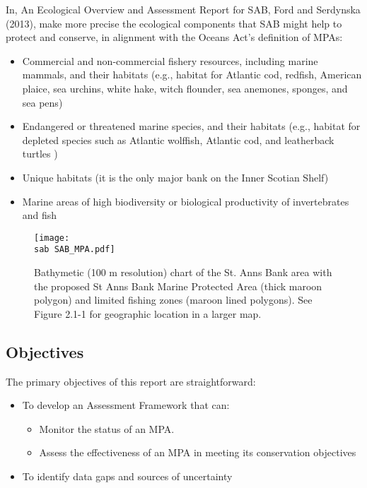 \documentclass[letterpaper,portrait,11pt]{scrartcl}
\numberwithin{equation}{section}		%
\numberwithin{figure}{section}			%
\numberwithin{table}{section}				%
\newcommand{\ecomod}{\string~/ecomod_data/}   %
\newcommand{\sab}{\ecomod/mpa/sab/}   %
\newcommand{\analysis}{\ecomod/mpa/analysis/}   %
\begin{document}
In, An Ecological Overview and Assessment Report for SAB, Ford and Serdynska (2013), make more precise the ecological components that SAB might help to protect and conserve, in alignment with the Oceans Act's definition of MPAs:

\begin{itemize}
	\item Commercial and non-commercial fishery resources, including marine mammals, and their habitats (e.g., habitat for Atlantic cod, redfish, American plaice, sea urchins, white hake, witch flounder, sea anemones, sponges, and sea pens)
  \item Endangered or threatened marine species, and their habitats (e.g., habitat for depleted species such as Atlantic wolffish, Atlantic cod, and leatherback turtles )
  \item Unique habitats (it is the only major bank on the Inner Scotian Shelf)
  \item Marine areas of high biodiversity or biological productivity of invertebrates and fish
\end{itemize}

\begin{figure}[h]
  \centering
  \texttt{[image: \\sab SAB\_MPA.pdf]}
  
  \caption{Bathymetic (100 m resolution) chart of the  St. Anns Bank area with the proposed St Anns Bank Marine Protected Area (thick maroon polygon) and limited fishing zones (maroon lined polygons). See Figure 2.1-1 for geographic location in a larger map.}
  \label{figSABCloseup}
\end{figure}

\subsection{Objectives}

The primary objectives of this report are straightforward:

\begin{itemize}
	\item To develop an Assessment Framework that can:
  \begin{itemize}
    \item	Monitor the status of an MPA.
  	\item Assess the effectiveness of an MPA in meeting its conservation objectives
  \end{itemize}
  \item To identify data gaps and sources of uncertainty 
\end{itemize}
\end{document}
